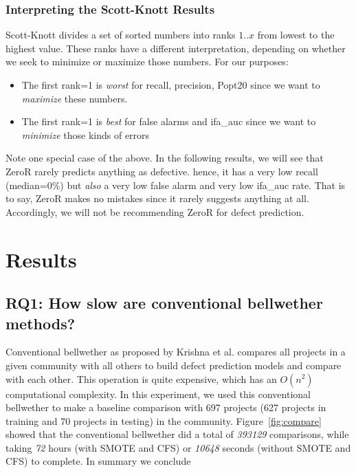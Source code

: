 \documentclass[10pt,journal,compsoc]{IEEEtran}
\newcommand{\bi}{\begin{itemize}}
\newcommand{\ei}{\end{itemize}}
\newcommand{\respto}[1]{
\fcolorbox{black}{black!15}{%
\label{resp:#1}%
\bf\scriptsize R{#1}}}
\begin{document}
\subsubsection{Interpreting the Scott-Knott Results}\label{sec:isk}

{\color{blue} Scott-Knott divides a set of sorted numbers into ranks $1..x$  from lowest to the highest value. These ranks have a different interpretation, depending on whether we seek to minimize or maximize those numbers. For our purposes:
\bi
\item The first rank=1 is {\em worst} for recall, precision, Popt20 since we want to {\em maximize} these numbers.
\item
The first rank=1 is {\em best} for false alarms and ifa\_auc since we want to {\em minimize} those kinds of errors
\ei
\respto{3-9}
Note one special case of the above. In the following results, we will see that ZeroR rarely predicts anything as defective. hence, it has a very low recall (median=0\%) but {\em also} a  very low false alarm and very low ifa\_auc rate. That is to say, ZeroR makes no mistakes since it rarely suggests anything at all.
Accordingly, we will not be recommending ZeroR for defect prediction.}




\section{Results}
\label{sec:results}

{\color{blue} 
\subsection*{RQ1:  How slow are   conventional bellwether methods? }
\label{sec:rq1}
\respto{1-6a} Conventional bellwether as proposed by Krishna et al. compares all projects in a given community with all others to build defect prediction models and compare with each other. This operation is quite expensive, which has an $ O(n^2) $ computational complexity. In this experiment, we used this conventional bellwether to make a baseline comparison with 697 projects (627 projects in training and 70 projects in testing) in the community. Figure~\ref{fig:compare} showed that the conventional bellwether did a total of {\em 393129} comparisons, while taking {\em 72} hours (with SMOTE and CFS) or {\em 10648} seconds (without SMOTE and CFS) to complete. In summary we conclude 

\vspace{2mm}
   \begin{blockquote}
            \end{blockquote}}
\end{document}
